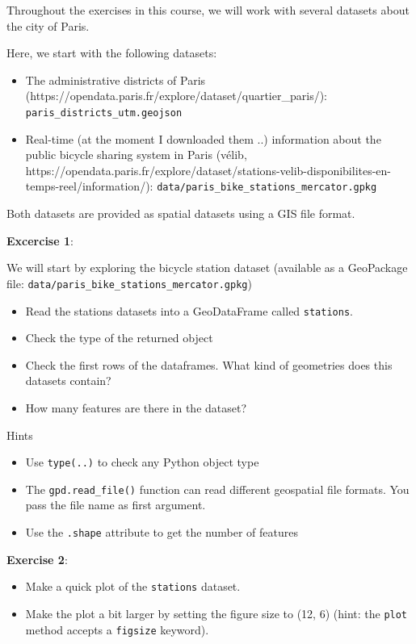 \documentclass[
  letterpaper,
  DIV=11,
  numbers=noendperiod]{scrreprt}
\providecommand{\tightlist}{%
  \setlength{\itemsep}{0pt}\setlength{\parskip}{0pt}}\usepackage{longtable,booktabs,array}
\begin{document}
Throughout the exercises in this course, we will work with several
datasets about the city of Paris.

Here, we start with the following datasets:

\begin{itemize}
\tightlist
\item
  The administrative districts of Paris
  (https://opendata.paris.fr/explore/dataset/quartier\_paris/):
  \texttt{paris\_districts\_utm.geojson}
\item
  Real-time (at the moment I downloaded them ..) information about the
  public bicycle sharing system in Paris (vélib,
  https://opendata.paris.fr/explore/dataset/stations-velib-disponibilites-en-temps-reel/information/):
  \texttt{data/paris\_bike\_stations\_mercator.gpkg}
\end{itemize}

Both datasets are provided as spatial datasets using a GIS file format.

\textbf{Excercise 1}:

We will start by exploring the bicycle station dataset (available as a
GeoPackage file: \texttt{data/paris\_bike\_stations\_mercator.gpkg})

\begin{itemize}
\tightlist
\item
  Read the stations datasets into a GeoDataFrame called
  \texttt{stations}.
\item
  Check the type of the returned object
\item
  Check the first rows of the dataframes. What kind of geometries does
  this datasets contain?
\item
  How many features are there in the dataset?
\end{itemize}

Hints

\begin{itemize}
\tightlist
\item
  Use \texttt{type(..)} to check any Python object type
\item
  The \texttt{gpd.read\_file()} function can read different geospatial
  file formats. You pass the file name as first argument.
\item
  Use the \texttt{.shape} attribute to get the number of features
\end{itemize}

\textbf{Exercise 2}:

\begin{itemize}
\tightlist
\item
  Make a quick plot of the \texttt{stations} dataset.
\item
  Make the plot a bit larger by setting the figure size to (12, 6)
  (hint: the \texttt{plot} method accepts a \texttt{figsize} keyword).
\end{itemize}
\end{document}
